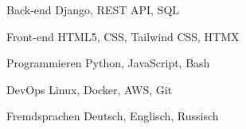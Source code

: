 
\begin{cvskills}

  \cvskill
  {Back-end} %
  {Django, REST API, SQL} %

  \cvskill
  {Front-end} %
  {HTML5, CSS, Tailwind CSS, HTMX} %

  \cvskill
  {Programmieren} %
  {Python, JavaScript, Bash} %

  \cvskill
  {DevOps} %
  {Linux, Docker, AWS, Git} %

  \cvskill
  {Fremdsprachen} %
  {Deutsch, Englisch, Russisch} %

\end{cvskills}
